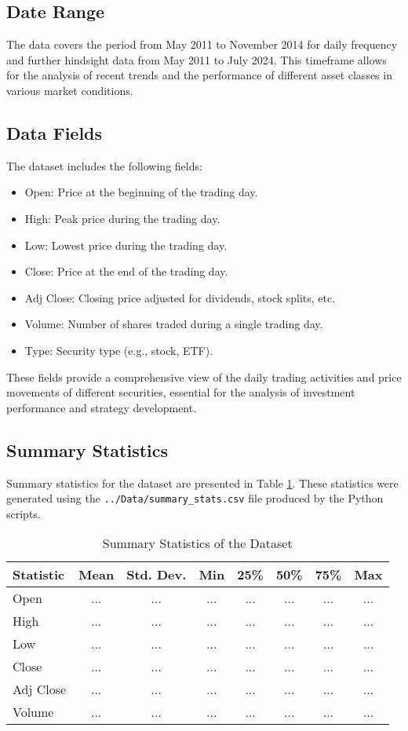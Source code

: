 \subsection{Date Range}
The data covers the period from May 2011 to November 2014 for daily frequency and further hindsight data from May 2011 to July 2024. This timeframe allows for the analysis of recent trends and the performance of different asset classes in various market conditions.

\subsection{Data Fields}
The dataset includes the following fields:
\begin{itemize}
    \item Open: Price at the beginning of the trading day.
    \item High: Peak price during the trading day.
    \item Low: Lowest price during the trading day.
    \item Close: Price at the end of the trading day.
    \item Adj Close: Closing price adjusted for dividends, stock splits, etc.
    \item Volume: Number of shares traded during a single trading day.
    \item Type: Security type (e.g., stock, ETF).
\end{itemize}

These fields provide a comprehensive view of the daily trading activities and price movements of different securities, essential for the analysis of investment performance and strategy development.

\subsection{Summary Statistics}
Summary statistics for the dataset are presented in Table \ref{tab:summary-stats}. These statistics were generated using the \texttt{../Data/summary\_stats.csv} file produced by the Python scripts.

\begin{table}[h!]
\centering
\begin{tabular}{lccccccc}
\hline
Statistic & Mean & Std. Dev. & Min & 25\% & 50\% & 75\% & Max \\
\hline
Open & ... & ... & ... & ... & ... & ... & ... \\
High & ... & ... & ... & ... & ... & ... & ... \\
Low & ... & ... & ... & ... & ... & ... & ... \\
Close & ... & ... & ... & ... & ... & ... & ... \\
Adj Close & ... & ... & ... & ... & ... & ... & ... \\
Volume & ... & ... & ... & ... & ... & ... & ... \\
\hline
\end{tabular}
\caption{Summary Statistics of the Dataset}
\label{tab:summary-stats}
\end{table}

\newpage
